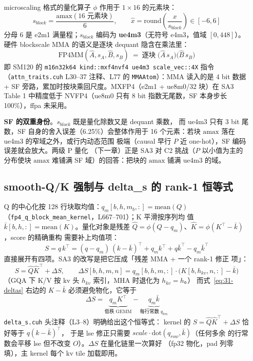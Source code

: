 microscaling 格式的量化算子 $\phi$ 作用于 $1\times16$ 的元素块：
\begin{equation}
  s_{block}=\frac{\mathrm{amax}(16\text{ 元素块})}{6},\qquad
  \hat x=\mathrm{round}\!\left(\frac{x}{s_{block}}\right)\in[-6,6]
  \label{eq:31-nvfp4-block}
\end{equation}
分母 6 是 e2m1 满量程；$s_{block}$ 编码为 \textbf{ue4m3}（无符号
e4m3，值域 $[0,448]$）。硬件 blockscale MMA 的语义是逐块
dequant 隐含在乘法里：
\begin{equation}
  \mathrm{FP4MM}(\hat A,s_A,\hat B,s_B)
  \;=\;\text{逐块}\;\bigl(\hat A\,s_A\bigr)\bigl(\hat B\,s_B\bigr)
  \label{eq:31-blockscale}
\end{equation}
即 SM120 的 \texttt{m16n32k64 kind::mxf4nvf4 ue4m3 scale\_vec::4X}
指令（\texttt{attn\_traits.cuh} L30--37 注释、L77 的
\texttt{MMAAtom}）：MMA 读入的是 4 bit 数据 +
SF 旁路，累加时按块乘回尺度。MXFP4（e2m1 + ue8m0/32 块）在 SA3
Table 1 中精度低于 NVFP4（ue8m0 只有 8 bit 指数无尾数，SF 本身步长
100\%），ffpa 未采用。

\textbf{SF 的双重身份}。$s_{block}$ 既是量化除数又是 dequant 乘数，
而 ue4m3 只有 3 bit 尾数，SF 自身的舍入误差（6.25\%）会整体作用于
16 个元素：若块 $\mathrm{amax}$ 落在 ue4m3 的窄域之外，或行内动态范围
极端（causal 早行 $P$ 近 one-hot），SF 编码误差就会放大。两级 P 量化
（下一章）正是 SA3 对 C2 挑战（$P$ 以小值为主的分布使块
$\mathrm{amax}$ 难铺满 SF 域）的回答：把块的 $\mathrm{amax}$ 铺满
ue4m3 的域。

\subsection{smooth-Q/K 强制与 delta\_s 的 rank-1 恒等式}

Q 的中心化按 128 行块取均值：$q_m[b,h,m_b,:]=\mathrm{mean}(Q)$
（\texttt{fp4\_q\_block\_mean\_kernel}，L667--701）；K 平滑按序列均
值 $\bar k[b,h,:]=\mathrm{mean}(K)$。量化对象是残差
$\hat Q=\phi(Q-q_m)$、$\hat K=\phi(K^\top-\bar k)$，score 的精确重构
需要补上均值项：
\begin{equation}
  S=q\,k^\top=(q-q_m)\,(k-\bar k)^\top+q_m k^\top+q\bar k^\top
  -q_m\bar k^\top
\end{equation}
直接展开有四项。SA3 的改写是把它压成「残差 MMA + 一个 rank-1 修正
项」：
\begin{equation}
  S=\hat Q\hat K^\top+\Delta S,\qquad
  \Delta S[b,h,m,n]=q_m[b,h,m,:]\cdot\bigl(K[b,h_{kv},n,:]-\bar k\bigr)
  \label{eq:31-deltas}
\end{equation}
（GQA 下 K/V 按 kv 头 $h_{kv}$ 索引，MHA 时退化为 $h_{kv}=h$。）
而式~\ref{eq:31-deltas} 右边的 $K-\bar k$ 必须避免物化，它等于
\begin{equation}
  \Delta S=\underbrace{q_m K^\top}_{\text{低秩 GEMM}}
  -\underbrace{q_m\bar k}_{\text{每行常数 }q_{km}}
  \label{eq:31-deltas-id}
\end{equation}
\texttt{delta\_s.cuh} 头注释（L3--8）明确给出这个恒等式：
kernel 的 $S=\hat Q\hat K^\top+\Delta S$ 恰好等于 $q(k-\bar k)^\top$，
于是 lse 修正只需要 $scale\cdot\mathrm{dot}(q_{row},\bar k)$（任何多余
的行常数会平移 lse 但不改变 $O$）。$\Delta S$ 在量化链里一次算好
（fp32 物化，pad 列零填），主 kernel 每个 kv tile 加载即用。

